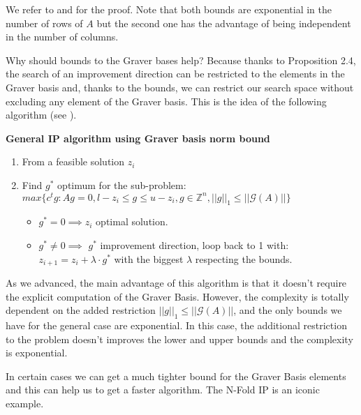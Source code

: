 We refer to \cite{ONN:2010} and \cite{EISENBRAND:2018} for the proof. Note that both bounds are exponential in the number of rows of $A$ but the second one has the advantage of being independent in the number of columns. 

Why should bounds to the Graver bases help? Because thanks to Proposition 2.4, the search of an improvement direction can be restricted to the elements in the Graver basis and, thanks to the bounds, we can restrict our search space without excluding any element of the Graver basis. This is the idea of the following algorithm (see \cite{HEMMECKE:2011}).


\textbf{General IP algorithm using Graver basis norm bound}
\vspace{-8pt}
\begin{enumerate}
    \item From a feasible solution $z_i$
    \item Find $g^*$ optimum for the sub-problem: \vspace{4pt}\\
          $max\{c^tg : Ag = 0, l-z_i \leq g \leq u-z_i, g \in \mathbb{Z}^n, ||g||_1 \leq ||\mathcal{G}(A)|| \}$ \vspace{4pt}
    \begin{itemize}
        \item $g^* = 0 \implies z_i$ optimal solution.
        \item $g^* \neq 0 \implies$ $g^*$ improvement direction, loop back to 1 with:\\
        $z_{i+1} = z_i + \lambda \cdot g^*$ with the biggest $\lambda$ respecting the bounds.
    \end{itemize}
\end{enumerate}


As we advanced, the main advantage of this algorithm is that it doesn't require the explicit computation of the Graver Basis. However, the complexity is totally dependent on the added restriction $||g||_1 \leq ||\mathcal{G}(A)||$, and the only bounds we have for the general case are exponential. In this case, the additional restriction to the problem doesn't improves the lower and upper bounds and the complexity is exponential. 

In certain cases we can get a much tighter bound for the Graver Basis elements and this can help us to get a faster algorithm. The N-Fold IP is an iconic example. 